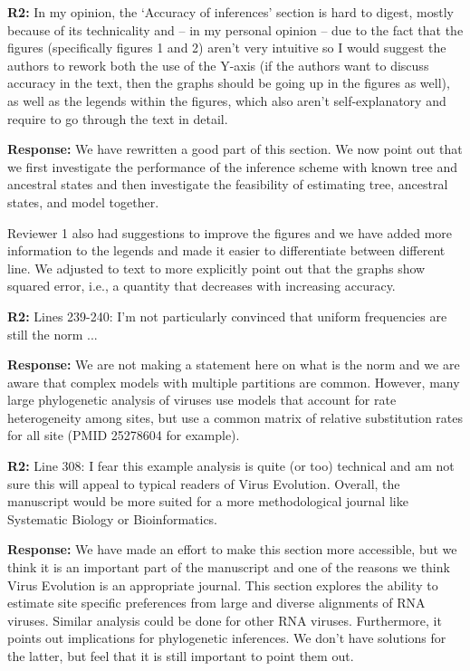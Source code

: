 \documentclass[aps,rmp,onecolumn]{revtex4-1}
\newcommand{\refb}[1]{\textbf{R2:} #1}
\newcommand{\response}[1]{{\color{black}\textbf{Response:} #1}}
\begin{document}
\refb{In my opinion, the ‘Accuracy of inferences’ section is hard to digest, mostly because of its technicality and -- in my personal opinion -- due to the fact that the figures (specifically figures 1 and 2) aren’t very intuitive so I would suggest the authors to rework both the use of the Y-axis (if the authors want to discuss accuracy in the text, then the graphs should be going up in the figures as well), as well as the legends within the figures, which also aren’t self-explanatory and require to go through the text in detail.}

\response{We have rewritten a good part of this section. We now point out that we first investigate the performance of the inference scheme with known tree and ancestral states and then investigate the feasibility of estimating tree, ancestral states, and model together.

Reviewer 1 also had suggestions to improve the figures and we have added more information to the legends and made it easier to differentiate between different line.
We adjusted to text to more explicitly point out that the graphs show squared error, i.e., a quantity that decreases with increasing accuracy.
}

\refb{Lines 239-240: I’m not particularly convinced that uniform frequencies are still the norm ...}

\response{We are not making a statement here on what is the norm and we are aware that complex models with multiple partitions are common. However, many large phylogenetic analysis of viruses use models that account for rate heterogeneity among sites, but use a common matrix of relative substitution rates for all site (PMID 25278604 for example). }

\refb{Line 308: I fear this example analysis is quite (or too) technical and am not sure this will appeal to typical readers of Virus Evolution. Overall, the manuscript would be more suited for a more methodological journal like Systematic Biology or Bioinformatics.}

\response{We have made an effort to make this section more accessible, but we think it is an important part of the manuscript and one of the reasons we think Virus Evolution is an appropriate journal.
This section explores the ability to estimate site specific preferences from large and diverse alignments of RNA viruses.
Similar analysis could be done for other RNA viruses.
Furthermore, it points out implications for phylogenetic inferences.
We don't have solutions for the latter, but feel that it is still important to point them out.
}
\end{document}
